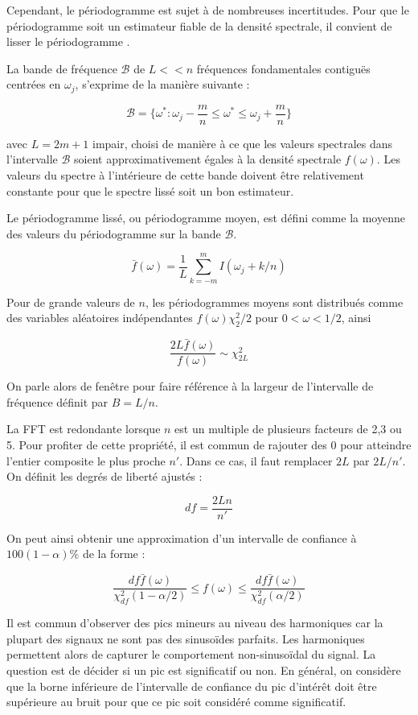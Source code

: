 \documentclass[12pt]{article}
\begin{document}
Cependant, le périodogramme est sujet à de nombreuses incertitudes. Pour que le périodogramme soit un estimateur fiable de la densité spectrale, il convient de lisser le périodogramme \citep{Shumway2016}. 

La bande de fréquence $\mathcal B$ de $L<<n$ fréquences fondamentales contiguës centrées en $\omega_j$, s'exprime de la manière suivante : 

\[\mathcal{B}=\Big\{\omega^*:\omega_j-\frac{m}{n}\leq\omega^*\leq\omega_j+\frac{m}{n}\Big\}\]

avec $L=2m+1$ impair, choisi de manière à ce que les valeurs spectrales dans l'intervalle $\mathcal B$ soient approximativement égales à la densité spectrale $f(\omega)$. Les valeurs du spectre à l'intérieure de cette bande doivent être relativement constante pour que le spectre lissé soit un bon estimateur. 

Le périodogramme lissé, ou périodogramme moyen, est défini comme la moyenne des valeurs du périodogramme sur la bande $\mathcal B$.

\[\bar{f}(\omega)=\frac{1}{L}\sum_{k=-m}^mI(\omega_j+k/n)\]

Pour de grande valeurs de $n$, les périodogrammes moyens sont distribués comme des variables aléatoires indépendantes $f(\omega)\chi_2^2/2$ pour $0<\omega<1/2$, ainsi

\[\frac{2L\bar{f}(\omega)}{f(\omega)}\sim \chi_{2L}^2\]

On parle alors de fenêtre pour faire référence à la largeur de l'intervalle de fréquence définit par $B=L/n$. 

La FFT est redondante lorsque $n$ est un multiple de plusieurs facteurs de 2,3 ou 5. Pour profiter de cette propriété, il est commun de rajouter des 0 pour atteindre l'entier composite le plus proche $n'$. Dans ce cas, il faut remplacer $2L$ par $2L/n'$. On définit les degrés de liberté ajustés : 

\[df=\frac{2Ln}{n'}\]

On peut ainsi obtenir une approximation d'un intervalle de confiance à $100(1-\alpha)\%$ de la forme :

\[\frac{df\bar{f}(\omega)}{\chi_{df}^2(1-\alpha/2)}\leq f(\omega) \leq \frac{df\bar{f}(\omega)}{\chi_{df}^2(\alpha/2)}\]

Il est commun d'observer des pics mineurs au niveau des harmoniques car la plupart des signaux ne sont pas des sinusoïdes parfaits. Les harmoniques permettent alors de capturer le comportement non-sinusoïdal du signal. La question est de décider si un pic est significatif ou non.
En général, on considère que la borne inférieure de l’intervalle de confiance du pic d’intérêt doit être supérieure au bruit pour que ce pic soit considéré comme significatif. 
\end{document}
